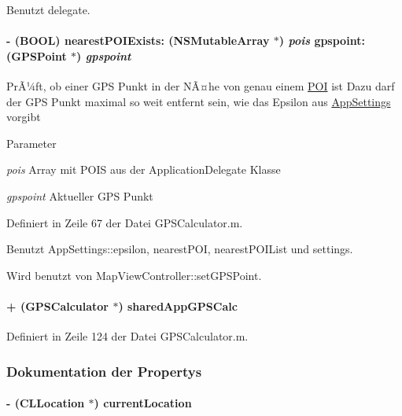 Benutzt delegate.\hypertarget{interface_g_p_s_calculator_a406a446181f898802d323447150b0f67}{
\paragraph[{nearestPOIExists:gpspoint:}]{\setlength{\rightskip}{0pt plus 5cm}-\/ (BOOL) nearestPOIExists: (NSMutableArray $\ast$) {\em pois}\/ gpspoint: ({\bf GPSPoint} $\ast$) {\em gpspoint}}\hfill}
\label{interface_g_p_s_calculator_a406a446181f898802d323447150b0f67}
PrÃ¼ft, ob einer GPS Punkt in der NÃ¤he von genau einem \hyperlink{interface_p_o_i}{POI} ist Dazu darf der GPS Punkt maximal so weit entfernt sein, wie das Epsilon aus \hyperlink{interface_app_settings}{AppSettings} vorgibt 
\begin{DoxyParams}{Parameter}
\item[{\em pois}]Array mit POIS aus der ApplicationDelegate Klasse \item[{\em gpspoint}]Aktueller GPS Punkt \end{DoxyParams}


Definiert in Zeile 67 der Datei GPSCalculator.m.

Benutzt AppSettings::epsilon, nearestPOI, nearestPOIList und settings.

Wird benutzt von MapViewController::setGPSPoint.\hypertarget{interface_g_p_s_calculator_a76b80925729654bc60faecb2a93e1877}{
\paragraph[{sharedAppGPSCalc}]{\setlength{\rightskip}{0pt plus 5cm}+ ({\bf GPSCalculator} $\ast$) sharedAppGPSCalc }\hfill}
\label{interface_g_p_s_calculator_a76b80925729654bc60faecb2a93e1877}


Definiert in Zeile 124 der Datei GPSCalculator.m.

\subsubsection{Dokumentation der Propertys}
\hypertarget{interface_g_p_s_calculator_ae9268fe3bb4bfc41efa35f108fe346a0}{
\paragraph[{currentLocation}]{\setlength{\rightskip}{0pt plus 5cm}-\/ (CLLocation $\ast$) currentLocation}\hfill}
\label{interface_g_p_s_calculator_ae9268fe3bb4bfc41efa35f108fe346a0}


